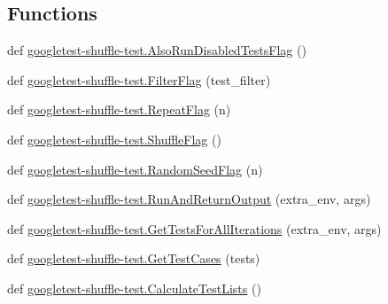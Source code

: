 \subsection*{Functions}
\begin{DoxyCompactItemize}
\item 
def \mbox{\hyperlink{namespacegoogletest-shuffle-test_a83bb3105809a3bdc00e90954b138ee78}{googletest-\/shuffle-\/test.\+Also\+Run\+Disabled\+Tests\+Flag}} ()
\item 
def \mbox{\hyperlink{namespacegoogletest-shuffle-test_a0bcd77f6d35c690b596bbddb8ee36765}{googletest-\/shuffle-\/test.\+Filter\+Flag}} (test\+\_\+filter)
\item 
def \mbox{\hyperlink{namespacegoogletest-shuffle-test_a37b05a14223b814fc403db43f9287ae4}{googletest-\/shuffle-\/test.\+Repeat\+Flag}} (n)
\item 
def \mbox{\hyperlink{namespacegoogletest-shuffle-test_a8f10ee7774fa361a058274410132c2da}{googletest-\/shuffle-\/test.\+Shuffle\+Flag}} ()
\item 
def \mbox{\hyperlink{namespacegoogletest-shuffle-test_aa073a0449ab11c6cccb62249e70bb06f}{googletest-\/shuffle-\/test.\+Random\+Seed\+Flag}} (n)
\item 
def \mbox{\hyperlink{namespacegoogletest-shuffle-test_a90f3ab31f08479d825e13816fbeea842}{googletest-\/shuffle-\/test.\+Run\+And\+Return\+Output}} (extra\+\_\+env, args)
\item 
def \mbox{\hyperlink{namespacegoogletest-shuffle-test_a4b81c9525e71495e7f512575a3fe436e}{googletest-\/shuffle-\/test.\+Get\+Tests\+For\+All\+Iterations}} (extra\+\_\+env, args)
\item 
def \mbox{\hyperlink{namespacegoogletest-shuffle-test_a81a570a6aadc23957a949f8740c3708d}{googletest-\/shuffle-\/test.\+Get\+Test\+Cases}} (tests)
\item 
def \mbox{\hyperlink{namespacegoogletest-shuffle-test_ac6f7bc9bc4f37d2f4b4d0b34fbefca1c}{googletest-\/shuffle-\/test.\+Calculate\+Test\+Lists}} ()
\end{DoxyCompactItemize}

